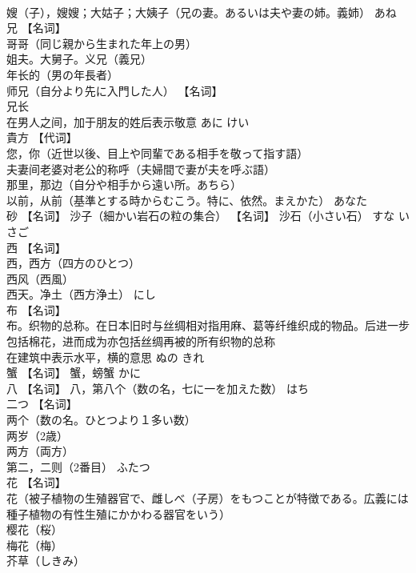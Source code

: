\documentclass[8pt]{extreport}
\begin{document}
\begin{CJK}{UTF8}{min}
\\	嫂（子），嫂嫂；大姑子；大姨子（兄の妻。あるいは夫や妻の姉。義姉）	あね	
\\	兄	【名词】 
\\	哥哥（同じ親から生まれた年上の男） 
\\	姐夫。大舅子。义兄（義兄） 
\\	年长的（男の年長者） 
\\	师兄（自分より先に入門した人） 【名词】 
\\	兄长 
\\	在男人之间，加于朋友的姓后表示敬意	あに けい	
\\	貴方	【代词】 
\\	您，你（近世以後、目上や同輩である相手を敬って指す語） 
\\	夫妻间老婆对老公的称呼（夫婦間で妻が夫を呼ぶ語） 
\\	那里，那边（自分や相手から遠い所。あちら） 
\\	以前，从前（基準とする時からむこう。特に、依然。まえかた）	あなた	
\\	砂	【名词】 沙子（細かい岩石の粒の集合） 【名词】 沙石（小さい石）	すな いさご	
\\	西	【名词】 
\\	西，西方（四方のひとつ） 
\\	西风（西風） 
\\	西天。净土（西方浄土）	にし	
\\	布	【名词】 
\\	布。织物的总称。在日本旧时与丝绸相对指用麻、葛等纤维织成的物品。后进一步包括棉花，进而成为亦包括丝绸再被的所有织物的总称 
\\	在建筑中表示水平，横的意思	ぬの きれ	
\\	蟹	【名词】 蟹，螃蟹	かに	
\\	八	【名词】 八，第八个（数の名，七に一を加えた数）	はち	
\\	二つ	【名词】 
\\	两个（数の名。ひとつより１多い数） 
\\	两岁（2歳） 
\\	两方（両方） 
\\	第二，二则（2番目）	ふたつ	
\\	花	【名词】 
\\	花（被子植物の生殖器官で、雌しべ（子房）をもつことが特徴である。広義には種子植物の有性生殖にかかわる器官をいう） 
\\	樱花（桜） 
\\	梅花（梅） 
\\	芥草（しきみ） 

\end{CJK}
\end{document}
